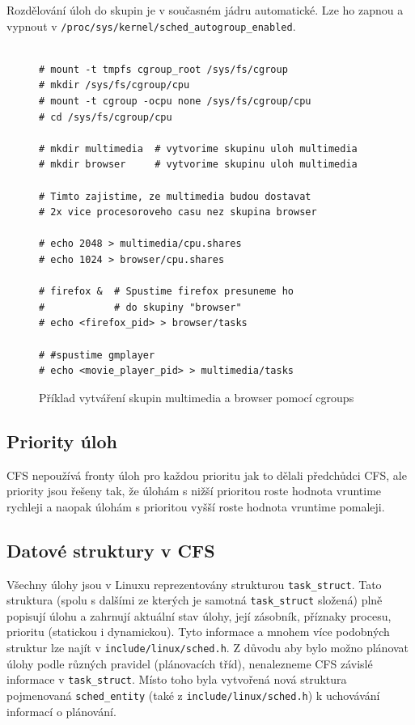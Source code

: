 \documentclass[
  master=true,
  font=sans,
  printversion=false,
  joinlists=true,
  figures=true,
  tables=true,
  sourcecodes=false,
  theorems=false,
  bibencoding=utf8,
  language=czech,
  encoding=utf8,
  field=ainfk,
  biblatex,
  glossaries,
  index
]{kidiplom}
\begin{document}
Rozdělování úloh do skupin je v současném jádru automatické. Lze ho zapnou a vypnout v \verb#/proc/sys/kernel/sched_autogroup_enabled#.

\begin{figure}[ht]
\caption{Příklad vytváření skupin multimedia a browser pomocí cgroups}
\center
\label{cgroups}

\begin{Verbatim}[frame=single]

# mount -t tmpfs cgroup_root /sys/fs/cgroup
# mkdir /sys/fs/cgroup/cpu
# mount -t cgroup -ocpu none /sys/fs/cgroup/cpu
# cd /sys/fs/cgroup/cpu

# mkdir multimedia  # vytvorime skupinu uloh multimedia 
# mkdir browser     # vytvorime skupinu uloh multimedia 

# Timto zajistime, ze multimedia budou dostavat 
# 2x vice procesoroveho casu nez skupina browser

# echo 2048 > multimedia/cpu.shares
# echo 1024 > browser/cpu.shares

# firefox &  # Spustime firefox presuneme ho
#            # do skupiny "browser"
# echo <firefox_pid> > browser/tasks

# #spustime gmplayer
# echo <movie_player_pid> > multimedia/tasks

\end{Verbatim}
\end{figure}

\newpage
\subsection{Priority úloh}

CFS nepoužívá fronty úloh pro každou prioritu jak to dělali předchůdci CFS, ale priority jsou řešeny tak, že úlohám s nižší prioritou roste hodnota vruntime rychleji a naopak úlohám s prioritou vyšší roste hodnota vruntime pomaleji.

\subsection{Datové struktury v CFS}

Všechny úlohy jsou v Linuxu reprezentovány strukturou \verb#task_struct#. Tato struktura (spolu s dalšími ze kterých je samotná \verb#task_struct# složená) plně popisují úlohu a zahrnují aktuální stav úlohy, její zásobník, příznaky procesu, prioritu (statickou i dynamickou). Tyto informace a mnohem více podobných struktur lze najít v \verb#include/linux/sched.h#. Z důvodu aby bylo možno plánovat úlohy podle různých pravidel (plánovacích tříd), nenalezneme CFS závislé informace v \verb#task_struct#. Místo toho byla vytvořená nová struktura pojmenovaná \verb#sched_entity# (také z \verb#include/linux/sched.h#) k uchovávání informací o plánování.
\end{document}
